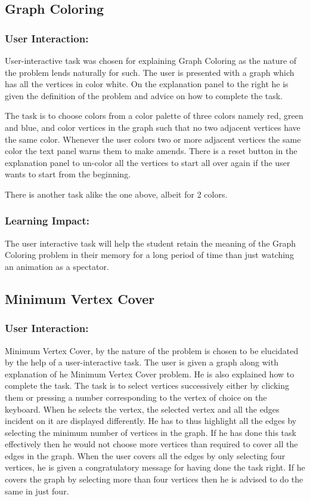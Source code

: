 \subsection{Graph Coloring}
\label{story: coloring}
\subsubsection{User Interaction:}
User-interactive task was chosen for explaining Graph Coloring as the nature
of the problem lends naturally for such. The user is presented with a graph
which has all the vertices in color white. On the explanation panel to the
right he is given the definition of the problem and advice on how to complete
the task.  

The task is to choose colors from a color palette of three colors namely red,
green and blue, and color vertices in the graph such that no two adjacent
vertices have the same color. Whenever the user colors two or more adjacent
vertices the same color the text panel warns them to make amends. There is a
reset button in the explanation panel to un-color all the vertices to start all
over again if the user wants to start from the beginning.

There is another task alike the one above, albeit for 2 colors.

\subsubsection{Learning Impact:}
The user interactive task will help the student retain the meaning of the Graph
Coloring problem in their memory for a long period of time than just watching
an animation as a spectator.

\subsection{Minimum Vertex Cover}
\label{story: vertexcover}
\subsubsection{User Interaction:}
Minimum Vertex Cover, by the nature of the problem is chosen to be
elucidated by the help of a user-interactive task. The user is given a graph
along with explanation of he Minimum Vertex Cover problem. He is also explained
how to complete the task. The task is to select vertices successively either by
clicking them or pressing a number corresponding to the vertex of choice on the
keyboard.  When he selects the vertex, the selected vertex and all the edges
incident on it are displayed differently. He has to thus highlight all the
edges by selecting the minimum number of vertices in the graph.  If he has done
this task effectively then he would not choose more vertices than required to
cover all the edges in the graph. When the user covers all the edges by only
selecting four vertices, he is given a congratulatory message for having done
the task right. If he covers the graph by selecting more than four vertices
then he is advised to do the same in just four.

